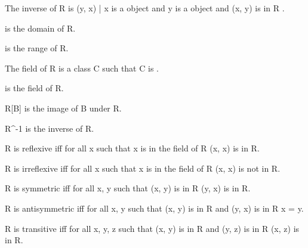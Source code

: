 \documentclass{article}
\begin{document}
\begin{forthel}
    \begin{definition} 
      The inverse of R is { (y, x) | x is a object and y is a object and (x, y) is in R }.
    \end{definition}

    \begin{definition} 
       is the domain of R.
    \end{definition}

    \begin{definition} 
       is the range of R.
    \end{definition}

    \begin{definition}
      The field of R is a class C such that C is .
    \end{definition}

    \begin{definition} 
       is the field of R.
    \end{definition}

    \begin{definition} 
      R[B] is the image of B under R.
    \end{definition}

    \begin{definition} 
      R^{-1} is the inverse of R.
    \end{definition}

    \begin{definition}
      R is reflexive iff for all x such that x is in the field of R (x, x) is in R.
    \end{definition}

    \begin{definition}
      R is irreflexive iff for all x such that x is in the field of R (x, x) is not in R.
    \end{definition}

    \begin{definition}
      R is symmetric iff for all x, y such that (x, y) is in R (y, x) is in R.
    \end{definition}

    \begin{definition}
      R is antisymmetric iff for all x, y such that (x, y) is in R and (y, x) is in R x = y.
    \end{definition}

    \begin{definition}
      R is transitive iff for all x, y, z such that (x, y) is in R and (y, z) is in R (x, z) is in R.
    \end{definition}


\end{forthel}
\end{document}
